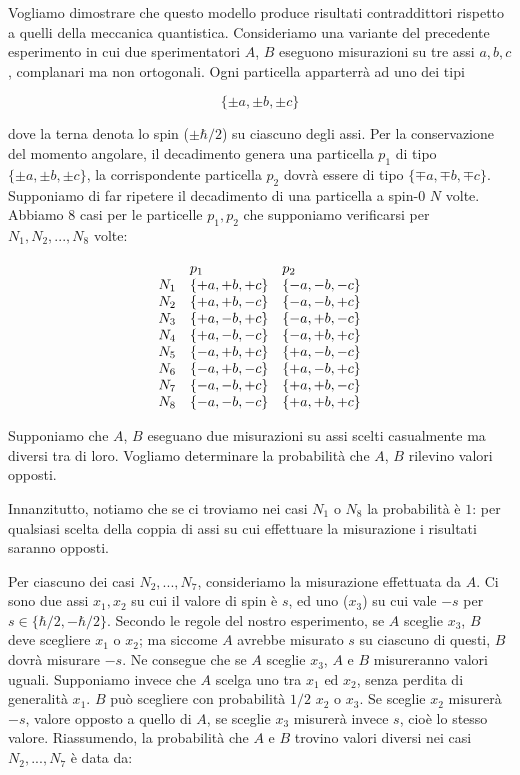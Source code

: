 Vogliamo dimostrare che questo modello produce risultati contraddittori rispetto a quelli della meccanica quantistica. Consideriamo una variante del precedente esperimento in cui due sperimentatori $A$, $B$ eseguono misurazioni su tre assi $a, b, c$, complanari ma non ortogonali. Ogni particella apparterr\`a ad uno dei tipi

	\[
		\{ \pm a, \pm b, \pm c\}
	\]

dove la terna denota lo spin ($\pm \hbar / 2$) su ciascuno degli assi. Per la conservazione del momento angolare, il decadimento genera una particella $p_1$ di tipo $\{ \pm a, \pm b, \pm c \}$, la corrispondente particella $p_2$ dovr\`a essere di tipo $ \{ \mp a, \mp b, \mp c \}$. Supponiamo di far ripetere il decadimento di una particella a spin-0 $N$ volte. Abbiamo 8 casi per le particelle $p_1, p_2$ che supponiamo verificarsi per $N_1, N_2, ..., N_8$ volte:

	\begin{equation}
		\begin{array} {l l l}
				& p_1 & p_2 \\
			N_1 & \{ +a, +b, +c \} & \{ -a, -b, -c \} \\
			N_2 & \{ +a, +b, -c \} & \{ -a, -b, +c \} \\
			N_3 & \{ +a, -b, +c \} & \{ -a, +b, -c \} \\
			N_4 & \{ +a, -b, -c \} & \{ -a, +b, +c \} \\
			N_5 & \{ -a, +b, +c \} & \{ +a, -b, -c \} \\
			N_6 & \{ -a, +b, -c \} & \{ +a, -b, +c \} \\
			N_7 & \{ -a, -b, +c \} & \{ +a, +b, -c \} \\
			N_8 & \{ -a, -b, -c \} & \{ +a, +b, +c \} \\
		\end{array}
	\end{equation}

Supponiamo che $A$, $B$ eseguano due misurazioni su assi scelti casualmente ma diversi tra di loro. Vogliamo determinare la probabilit\`a che $A$, $B$ rilevino valori opposti.

Innanzitutto, notiamo che se ci troviamo nei casi $N_1$ o $N_8$ la probabilit\`a \`e $1$: per qualsiasi scelta della coppia di assi su cui effettuare la misurazione i risultati saranno opposti.

Per ciascuno dei casi $N_2, ..., N_7$, consideriamo la misurazione effettuata da $A$. Ci sono due assi $x_1, x_2$ su cui il valore di spin \`e $s$, ed uno ($x_3$) su cui vale $-s$ per $s \in \{ \hbar/2, -\hbar/2 \}$. Secondo le regole del nostro esperimento, se $A$ sceglie $x_3$, $B$ deve scegliere $x_1$ o $x_2$; ma siccome $A$ avrebbe misurato $s$ su ciascuno di questi, $B$ dovr\`a misurare $-s$. Ne consegue che se $A$ sceglie $x_3$, $A$ e $B$ misureranno valori uguali. Supponiamo invece che $A$ scelga uno tra $x_1$ ed $x_2$, senza perdita di generalit\`a $x_1$. $B$ pu\`o scegliere con probabilit\`a $1/2$ $x_2$ o $x_3$. Se sceglie $x_2$ misurer\`a $-s$, valore opposto a quello di $A$, se sceglie $x_3$ misurer\`a invece $s$, cio\`e lo stesso valore. Riassumendo, la probabilit\`a che $A$ e $B$ trovino valori diversi nei casi $N_2, ..., N_7$ \`e data da:

